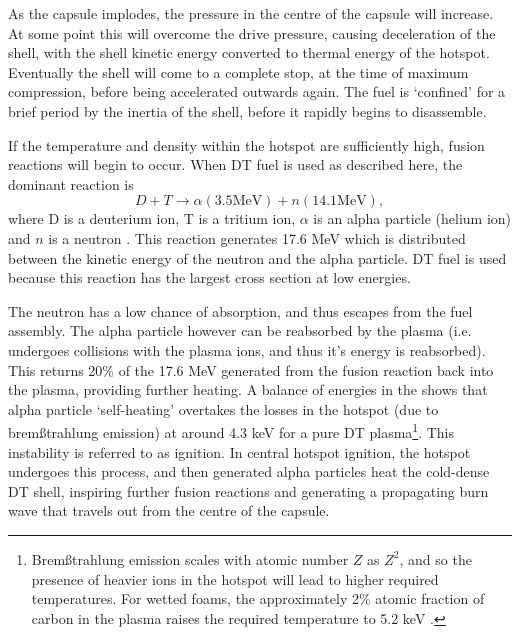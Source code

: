 As the capsule implodes, the pressure in the centre of the capsule will increase. At some point this will overcome the drive pressure, causing deceleration of the shell, with the shell kinetic energy converted to thermal energy of the hotspot. Eventually the shell will come to a complete stop, at the time of maximum compression, before being accelerated outwards again. The fuel is `confined' for a brief period by the inertia of the shell, before it rapidly begins to disassemble.

If the temperature and density within the hotspot are sufficiently high, fusion reactions will begin to occur. When DT fuel is used as described here, the dominant reaction is 
\begin{equation} D + T \rightarrow \alpha(3.5 \text{MeV}) + n(14.1 \text{MeV}), \end{equation}
where D is a deuterium ion, T is a tritium ion, $\alpha$ is an alpha particle (helium ion) and $n$ is a neutron \cite{Atzeni2008}. This reaction generates 17.6 MeV which is distributed between the kinetic energy of the neutron and the alpha particle. DT fuel is used because this reaction has the largest cross section at low energies.

The neutron has a low chance of absorption, and thus escapes from the fuel assembly. The alpha particle however can be reabsorbed by the plasma (i.e. undergoes collisions with the plasma ions, and thus it's energy is reabsorbed). This returns 20\% of the 17.6 MeV generated from the fusion reaction back into the plasma, providing further heating. A balance of energies in the shows that alpha particle `self-heating' overtakes the losses in the hotspot (due to brem{\ss}trahlung emission) at around 4.3 keV for a pure DT plasma\footnote{Brem{\ss}trahlung emission scales with atomic number $Z$ as $Z^2$, and so the presence of heavier ions in the hotspot will lead to higher required temperatures. For wetted foams, the approximately 2\% atomic fraction of carbon in the plasma raises the required temperature to 5.2 keV \cite{Olson2013}.}. This instability is referred to as ignition. In central hotspot ignition, the hotspot undergoes this process, and then generated alpha particles heat the cold-dense DT shell, inspiring further fusion reactions and generating a propagating burn wave that travels out from the centre of the capsule.

